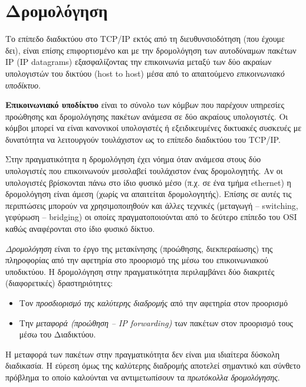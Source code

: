 %
%
\setcounter{section}{5}
\section{Δρομολόγηση}

Το επίπεδο διαδικτύου στο TCP/IP εκτός από τη διευθυνσιοδότηση (που έχουμε δει), είναι επίσης επιφορτισμένο και με την δρομολόγηση των αυτοδύναμων πακέτων IP (IP datagrams) εξασφαλίζοντας την επικοινωνία μεταξύ των δύο ακραίων υπολογιστών του δικτύου (host to host) μέσα από το απαιτούμενο \emph{επικοινωνιακό υποδίκτυο}.

\begin{inthebox}
\textbf{Επικοινωνιακό υποδίκτυο} είναι το σύνολο των κόμβων που παρέχουν υπηρεσίες προώθησης και δρομολόγησης πακέτων ανάμεσα σε δύο ακραίους υπολογιστές. Οι κόμβοι μπορεί να είναι κανονικοί υπολογιστές ή εξειδικευμένες δικτυακές συσκευές με δυνατότητα να λειτουργούν τουλάχιστον ως το επίπεδο διαδικτύου του TCP/IP.\\
\end{inthebox}

Στην πραγματικότητα η δρομολόγηση έχει νόημα όταν ανάμεσα στους δύο υπολογιστές που επικοινωνούν μεσολαβεί τουλάχιστον ένας δρομολογητής. Αν οι υπολογιστές βρίσκονται πάνω στο ίδιο φυσικό μέσο (π.χ. σε ένα τμήμα ethernet) η δρομολόγηση είναι άμεση (χωρίς να απαιτείται δρομολογητής). Επίσης σε αυτές τις περιπτώσεις μπορούν να χρησιμοποιηθούν και άλλες τεχνικές (μεταγωγή -- switching, γεφύρωση -- bridging) οι οποίες πραγματοποιούνται από το δεύτερο επίπεδο του OSI καθώς αναφέρονται στο ίδιο φυσικό δίκτυο. 

\emph{Δρομολόγηση} είναι το έργο της μετακίνησης (προώθησης, διεκπεραίωσης) της πληροφορίας από την αφετηρία στο προορισμό της μέσω του επικοινωνιακού υποδικτύου. Η δρομολόγηση στην πραγματικότητα περιλαμβάνει δύο διακριτές (διαφορετικές) δραστηριότητες:

\begin{itemize}
\item Τον \emph{προσδιορισμό της καλύτερης διαδρομής} από την αφετηρία στον προορισμό
\item Την \emph{μεταφορά (προώθηση -- IP forwarding)} των πακέτων στον προορισμό τους μέσω του Διαδικτύου.
\end{itemize}

Η μεταφορά των πακέτων στην πραγματικότητα δεν είναι μια ιδιαίτερα δύσκολη διαδικασία. Η εύρεση όμως της καλύτερης διαδρομής αποτελεί σημαντικό και σύνθετο πρόβλημα το οποίο καλούνται να αντιμετωπίσουν τα \emph{πρωτόκολλα δρομολόγησης}. 

